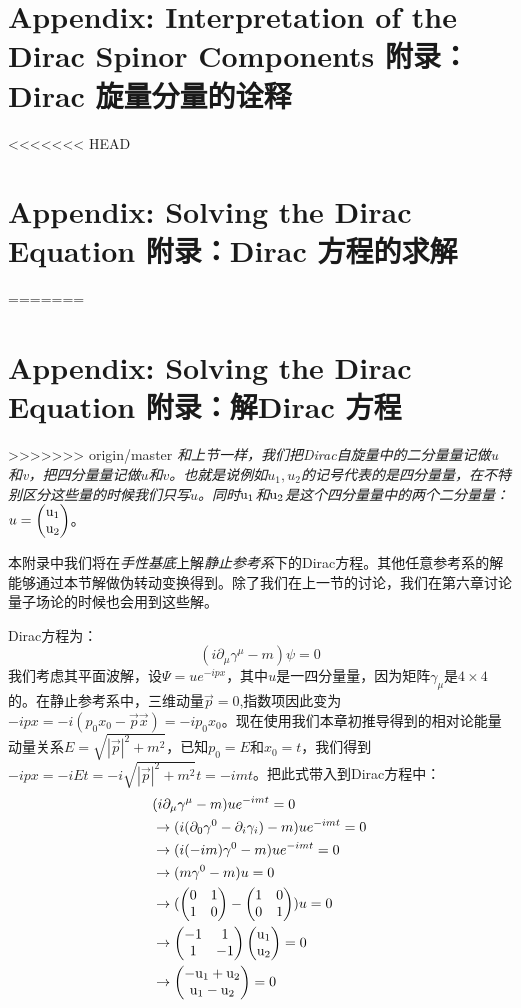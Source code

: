 \section[附录：Dirac 旋量分量的诠释]{Appendix: Interpretation of the Dirac Spinor Components 附录：Dirac 旋量分量的诠释}\label{sec8.8}
<<<<<<< HEAD
\section[附录：Dirac 方程的求解]{Appendix: Solving the Dirac Equation 附录：Dirac 方程的求解}\label{sec8.9}
=======

\section[附录：解Dirac 方程]{Appendix: Solving the Dirac Equation 附录：解Dirac 方程}\label{sec8.9}
>>>>>>> origin/master
{\it 和上节一样，我们把Dirac自旋量中的二分量量记做{\rm u}和{\rm v}，把四分量量记做$u$和$v$。也就是说例如$u_1,u_2$的记号代表的是四分量量，在不特别区分这些量的时候我们只写$u$。同时${\rm u_1}$和${\rm u_2}$是这个四分量量中的两个二分量量：$u=\begin{pmatrix} \rm u_1 \\ \rm u_2 \end{pmatrix} $}。
\par
本附录中我们将在{\it 手性基底}上解{\it 静止参考系}下的Dirac方程。其他任意参考系的解能够通过本节解做伪转动变换得到。除了我们在上一节的讨论，我们在第六章讨论量子场论的时候也会用到这些解。\par
Dirac方程为：
\begin{equation}
(i\partial_\mu \gamma^\mu -m)\psi=0
\end{equation}
我们考虑其平面波解，设$\Psi=ue^{-ipx}$，其中$u$是一四分量量，因为矩阵$\gamma_\mu$是$4 \times 4$的。在静止参考系中，三维动量$\vec{p}=0$,指数项因此变为$-ipx=-i(p_0x_0-\vec{p}\vec{x})=-ip_0x_0$。现在使用我们本章初推导得到的相对论能量动量关系$E=\sqrt{|\vec{p}|^2+m^2}$，已知$p_0=E$和$x_0=t$，我们得到$-ipx=-iEt=-i\sqrt{|\vec{p}|^2+m^2}t=-imt$。把此式带入到Dirac方程中：
\begin{equation}
\begin{split}
&(i\partial_\mu\gamma^\mu-m)ue^{-imt}=0\\
&\to (i(\partial_0\gamma^0-\partial_i\gamma_i)-m)ue^{-imt}=0\\
&\to (i(-im)\gamma^0-m)ue^{-imt}=0\\
&\to (m\gamma^0-m)u=0\\
&\to (\begin{pmatrix} 0 & 1 \\ 1 & 0 \end{pmatrix} -\begin{pmatrix} 1 & 0 \\ 0 & 1 \end{pmatrix})u=0\\
&\to \begin{pmatrix} -1 & 1 \\ 1 & -1 \end{pmatrix} \begin{pmatrix} \rm u_1 \\ \rm u_2 \end{pmatrix} =0\\
&\to \begin{pmatrix} \rm -u_1+u_2 \\ \rm u_1-u_2 \end{pmatrix} =0
\end{split}
\end{equation}
